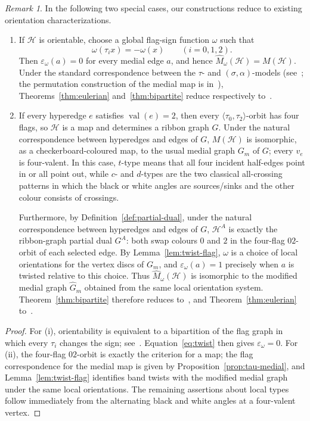 \documentclass{article}
\theoremstyle{definition}
\theoremstyle{remark}
\newtheorem{remark}[theorem]{Remark}
\newcommand{\Hcal}{\mathcal{H}}
\newcommand{\val}{\operatorname{val}}
\begin{document}
\begin{remark}\label{prop:specializations}
In the following two special cases, our constructions reduce to existing orientation characterizations.
\begin{enumerate}[label=\textup{(\roman*)}]
\item If $\Hcal$ is orientable, choose a global flag-sign function $\omega$ such that
\[
 \omega(\tau_i x)=-\omega(x)\qquad(i=0,1,2).
\]
Then $\varepsilon_\omega(a)=0$ for every medial edge $a$, and hence $\widehat M_\omega(\Hcal)=M(\Hcal)$. Under the standard correspondence between the $\tau$- and $(\sigma,\alpha)$-models (see~\cite[Section~1.3 and Theorem~2.4]{ChmutovVignes2022}; the permutation construction of the medial map is in~\cite[Definition~3.1]{CoriHetyei2025}), Theorems~\ref{thm:eulerian} and~\ref{thm:bipartite} reduce respectively to~\cite[Theorems~5.3 and~6.5]{HanMetsidik2026}.

\item If every hyperedge $e$ satisfies $\val(e)=2$, then every $\langle\tau_0,\tau_2\rangle$-orbit has four flags, so $\Hcal$ is a map and determines a ribbon graph $G$. Under the natural correspondence between hyperedges and edges of $G$, $M(\Hcal)$ is isomorphic, as a checkerboard-coloured map, to the usual medial graph $G_m$ of $G$; every $v_e$ is four-valent. In this case, $t$-type means that all four incident half-edges point in or all point out, while $c$- and $d$-types are the two classical all-crossing patterns in which the black or white angles are sources/sinks and the other colour consists of crossings.

Furthermore, by Definition~\ref{def:partial-dual}, under the natural correspondence between hyperedges and edges of $G$, $\Hcal^A$ is exactly the ribbon-graph partial dual $G^A$: both swap colours $0$ and $2$ in the four-flag $02$-orbit of each selected edge. By Lemma~\ref{lem:twist-flag}, $\omega$ is a choice of local orientations for the vertex discs of $G_m$, and $\varepsilon_\omega(a)=1$ precisely when $a$ is twisted relative to this choice. Thus $\widehat M_\omega(\Hcal)$ is isomorphic to the modified medial graph $\widehat G_m$ obtained from the same local orientation system. Theorem~\ref{thm:bipartite} therefore reduces to~\cite[Theorem~1.4]{DengJinMetsidik2020}, and Theorem~\ref{thm:eulerian} to~\cite[Theorem~1.5]{DengJinMetsidik2020}.
\end{enumerate}
\end{remark}

\begin{proof}
For (i), orientability is equivalent to a bipartition of the flag graph in which every $\tau_i$ changes the sign; see~\cite[Section~1.3]{ChmutovVignes2022}. Equation~\eqref{eq:twist} then gives $\varepsilon_\omega=0$. For (ii), the four-flag $02$-orbit is exactly the criterion for a map; the flag correspondence for the medial map is given by Proposition~\ref{prop:tau-medial}, and Lemma~\ref{lem:twist-flag} identifies band twists with the modified medial graph under the same local orientations. The remaining assertions about local types follow immediately from the alternating black and white angles at a four-valent vertex.
\end{proof}
\end{document}
